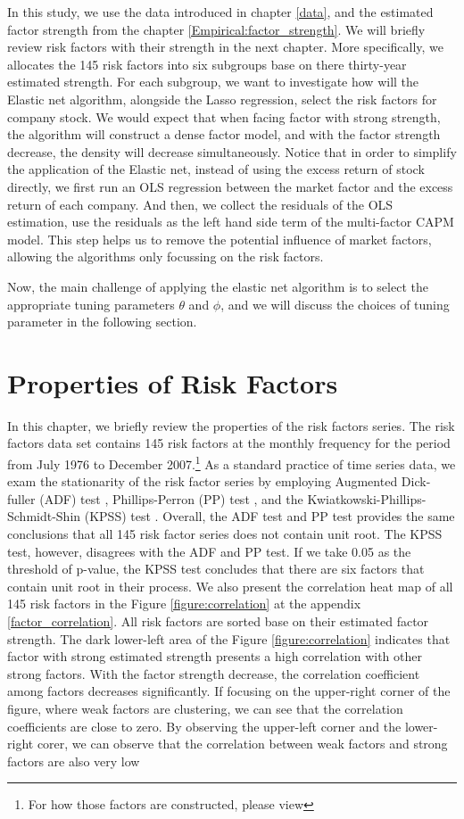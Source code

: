 In this study, we use the data introduced in chapter \ref{data}, and the estimated factor strength from the chapter \ref{Empirical:factor_strength}.
We will briefly review risk factors with their strength in the next chapter.
More specifically, we allocates the 145 risk factors into six subgroups base on there thirty-year estimated strength.
For each subgroup, we want to investigate how will the Elastic net algorithm, alongside the Lasso regression, select the risk factors for company stock.
We would expect that when facing factor with strong strength, the algorithm will construct a dense factor model, and with the factor strength decrease, the density will decrease simultaneously.
Notice that in order to simplify the application of the Elastic net, instead of using the excess return of stock directly, we first run an OLS regression between the market factor and the excess return of each company.
And then, we collect the residuals of the OLS estimation, use the residuals as the left hand side term of the multi-factor CAPM model.
This step helps us to remove the potential influence of market factors, allowing the algorithms only focussing on the risk factors. 

Now, the main challenge of applying the elastic net algorithm is to select the appropriate tuning parameters $\theta$ and $\phi$, and we will discuss the choices of tuning parameter in the following section.

\section{Properties of Risk Factors}
In this chapter, we briefly review the properties of the risk factors series. 
The risk factors data set contains 145 risk factors at the monthly frequency for the period from July 1976 to December 2007.\footnote{For how those factors are constructed, please view }
As a standard practice of time series data, we exam the stationarity of the risk factor series by employing Augmented Dick-fuller (ADF) test \cite{Dickey1979},  Phillips-Perron (PP) test \cite{Phillips1988}, and the Kwiatkowski-Phillips-Schmidt-Shin (KPSS) test \cite{Kwiatkowski1992}.
Overall, the ADF test and PP test provides the same conclusions that all 145 risk factor series does not contain unit root.
The KPSS test, however, disagrees with the ADF and PP test.
If we take 0.05 as the threshold of p-value, the KPSS test concludes that there are six factors that contain unit root in their process.
We also present the correlation heat map of all 145 risk factors in the Figure \ref{figure:correlation} at the appendix \ref{factor_correlation}.
All risk factors are sorted base on their estimated factor strength.
The dark lower-left area of the Figure \ref{figure:correlation} indicates that factor with strong estimated strength presents a high correlation with other strong factors.
With the factor strength decrease, the correlation coefficient among factors decreases significantly.
If focusing on the upper-right corner of the figure, where weak factors are clustering, we can see that the correlation coefficients are close to zero.
By observing the upper-left corner and the lower-right corer, we can observe that the correlation between weak factors and strong factors are also very low


